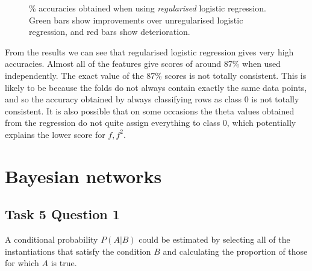 \documentclass[a4paper,11pt]{article}
\begin{document}
\begin{figure}
\centering
\begin{bchart}[step=20,max=100]
		\smallskip
		\smallskip
		\smallskip
		\smallskip
		\smallskip
		\smallskip
		\smallskip
		\smallskip
		\smallskip
		\smallskip
		\smallskip
\end{bchart}
\caption{\% accuracies obtained when using \textit{regularised} logistic regression.  Green bars show improvements over unregularised logistic regression, and red bars show deterioration.}
\label{task3reglogistic}
\end{figure}

From the results we can see that regularised logistic regression gives very high accuracies.  Almost all of the features give scores of around 87\% when used independently.  The exact value of the 87\%{} scores is not totally consistent.  This is likely to be because the folds do not always contain exactly the same data points, and so the accuracy obtained by always classifying rows as class 0 is not totally consistent.  It is also possible that on some occasions the theta values obtained from the regression do not quite assign everything to class 0, which potentially explains the lower score for $f,f^2$.

\section{Bayesian networks}

\subsection{Task 5 Question 1}

A conditional probability $P(A|B)$ could be estimated by selecting all of the instantiations that satisfy the condition $B$ and calculating the proportion of those for which $A$ is true.
\end{document}
